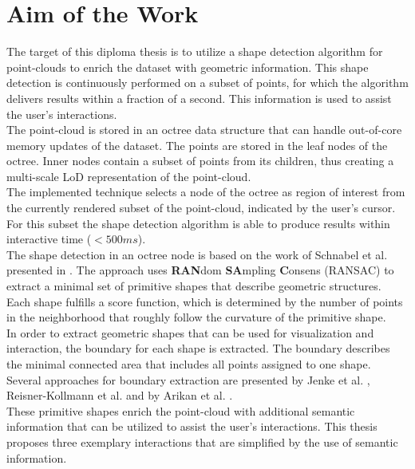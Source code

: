 \section{Aim of the Work}
\label{sec:aim}
The target of this diploma thesis is to utilize a shape detection algorithm for point-clouds to enrich the dataset with geometric information. This shape detection is continuously performed on a subset of points, for which the algorithm delivers results within a fraction of a second. This information is used to assist the user's interactions.
\\
The point-cloud is stored in an octree data structure that can handle out-of-core memory updates of the dataset. The points are stored in the leaf nodes of the octree. Inner nodes contain a subset of points from its children, thus creating a multi-scale LoD representation of the point-cloud.
\\
The implemented technique selects a node of the octree as region of interest from the currently rendered subset of the point-cloud, indicated by the user's cursor. For this subset the shape detection algorithm is able to produce results within interactive time ($<500ms$).
\\
The shape detection in an octree node is based on the work of Schnabel et al. presented in \cite{schnabel-2007-efficient}. The approach uses \textbf{RAN}dom \textbf{SA}mpling \textbf{C}onsens (RANSAC) \cite{fischler1981random} to extract a minimal set of primitive shapes that describe geometric structures. Each shape fulfills a score function, which is determined by the number of points in the neighborhood that roughly follow the curvature of the primitive shape.
\\
In order to extract geometric shapes that can be used for visualization and interaction, the boundary for each shape is extracted. The boundary describes the minimal connected area that includes all points assigned to one shape. Several approaches for boundary extraction are presented by Jenke et al. \cite{jenke2008surface},
Reisner-Kollmann et al. \cite{reisner2013reconstructing} and by Arikan et al. \cite{arikan-2013-osn}.
\\
These primitive shapes enrich the point-cloud with additional semantic information that can be utilized to assist the user's interactions. This thesis proposes three exemplary interactions that are simplified by the use of semantic information. 
\\
